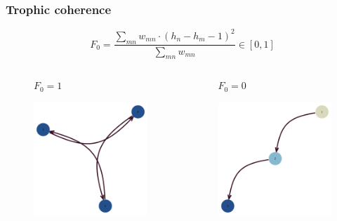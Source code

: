 \documentclass{beamer}
\begin{document}
\begin{frame}
    \frametitle{Trophic coherence}
    \begin{equation}
        F_0 = \frac{\sum_{mn} w_{mn} \cdot (h_n - h_m - 1)^2}{\sum_{mn} w_{mn}} \in [0, 1]
    \end{equation}
    \begin{columns}
        \begin{column}{.49\textwidth}
            \begin{figure}
                \textbf{$F_0 = 1$}\par\medskip
                \includegraphics[width=0.8\linewidth,height=0.8\textheight,keepaspectratio]{../../plots/random/lv-network-coherent.png}
            \end{figure}
        \end{column}
        \begin{column}{.49\textwidth}
            \begin{figure}
                \textbf{$F_0 = 0$}\par\medskip
                \includegraphics[width=0.8\linewidth,height=0.8\textheight,keepaspectratio]{../../plots/random/lv-network-incoherent.png}

\end{figure}
\end{column}
\end{columns}
\end{frame}
\end{document}
